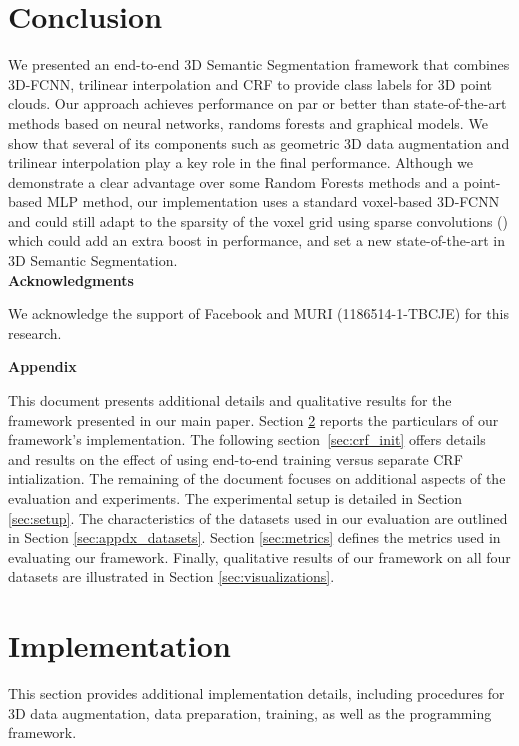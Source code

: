 \documentclass[10pt,twocolumn,letterpaper]{article}
\newcommand{\fccrf}[0]{CRF\xspace}
\newcommand{\threedfcnn}[0]{3D-FCNN\xspace}
\newif\ifarxiv
\begin{document}
\section{Conclusion}\label{sec:conclusion}
We presented an end-to-end 3D Semantic Segmentation framework that combines \threedfcnn, trilinear interpolation and \fccrf to provide class labels for 3D point clouds. Our approach achieves performance on par or better than state-of-the-art methods based on neural networks, randoms forests and graphical models. We show that several of its components such as geometric 3D data augmentation and trilinear interpolation play a key role in the final performance.
Although we demonstrate a clear advantage over some Random Forests methods and a point-based MLP method, our implementation uses a standard voxel-based \threedfcnn and could still adapt to the sparsity of the voxel grid using sparse convolutions (\eg \cite{octnet}) which could add an extra boost in performance, and set a new state-of-the-art in 3D Semantic Segmentation. \\

\textbf{Acknowledgments}

We acknowledge the support of Facebook and MURI (1186514-1-TBCJE) for this research.

\vspace{3mm}
{\small


}

\ifarxiv
\clearpage
\appendix
\begin{strip}\centering
 \LARGE \textbf{Appendix}
 \normalsize
\end{strip}

This document presents additional details and qualitative results for the framework presented in our main paper. Section \ref{sec:appdx_implementation} reports the particulars of our framework's implementation. The following section~\ref{sec:crf_init} offers details and results on the effect of using end-to-end training versus separate CRF intialization. The remaining of the document focuses on additional aspects of the evaluation and experiments. The experimental setup is detailed in Section \ref{sec:setup}. The characteristics of the datasets used in our evaluation are outlined in Section \ref{sec:appdx_datasets}. Section \ref{sec:metrics} defines the metrics used in evaluating our framework. Finally, qualitative results of our framework on all four datasets are illustrated in Section \ref{sec:visualizations}.


\section{Implementation}\label{sec:appdx_implementation}
This section provides additional implementation details, including procedures for 3D data augmentation, data preparation, training, as well as the programming framework.
\end{document}
